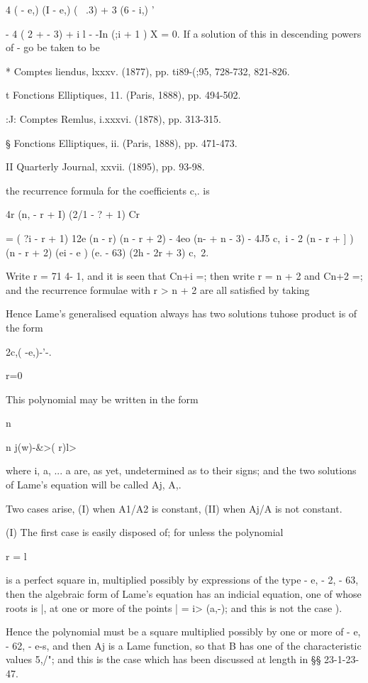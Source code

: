 {{{{{{{{4 ( - e,) (I - e,) ( \ .3) + 3 (6 - i,) '

- 4 ( 2 + - 3) + i l - -In (;i + 1 ) X = 0. If a solution of this in
descending powers of - go be taken to be

* Comptes liendus, lxxxv. (1877), pp. ti89-(;95, 728-732, 821-826.

t Fonctions Elliptiques, 11. (Paris, 1888), pp. 494-502.

:J: Comptes Remlus, i.xxxvi. (1878), pp. 313-315.

§ Fonctions Elliptiques, ii. (Paris, 1888), pp. 471-473.

II Quarterly Journal, xxvii. (1895), pp. 93-98.

%
%

the recurrence formula for the coefficients c,. is

4r (n, - r + I) (2/1 - ? + 1) Cr

= ( ?i - r + 1) 12e (n - r) (n - r + 2) - 4eo (n- + n - 3) - 4J5 c,\ i
- 2 (n - r + ] ) (n - r + 2) (ei - e ) (e. - 63) (2h - 2r + 3) c,\ 2.

Write r = 71 4- 1, and it is seen that Cn+i =; then write r = n + 2
and Cn+2 =; and the recurrence formulae with r > n + 2 are all
satisfied by taking

Hence Lame's generalised equation always has two solutions tuhose
product is of the form

2c,( -e,)-'-.

r=0

This polynomial may be written in the form

n

n j(w)-\&>( r)l>

where i, a, ... a are, as yet, undetermined as to their signs; and
the two solutions of Lame's equation will be called Aj, A,.

Two cases arise, (I) when A1/A2 is constant, (II) when Aj/A is not
constant.

(I) The first case is easily disposed of; for unless the polynomial

r = l

is a perfect square in, multiplied possibly by expressions of the
type - e, - 2, - 63, then the algebraic form of Lame's equation has
an indicial equation, one of whose roots is |, at one or more of the
points | = i> (a,-); and this is not the case ).

Hence the polynomial must be a square multiplied possibly by one or
more of - e, - 62, - e-s, and then Aj is a Lame function, so that B
has one of the characteristic values 5,/"; and this is the case which
has been discussed at length in §§ 23-1-23-47.

}}}}}}}}
